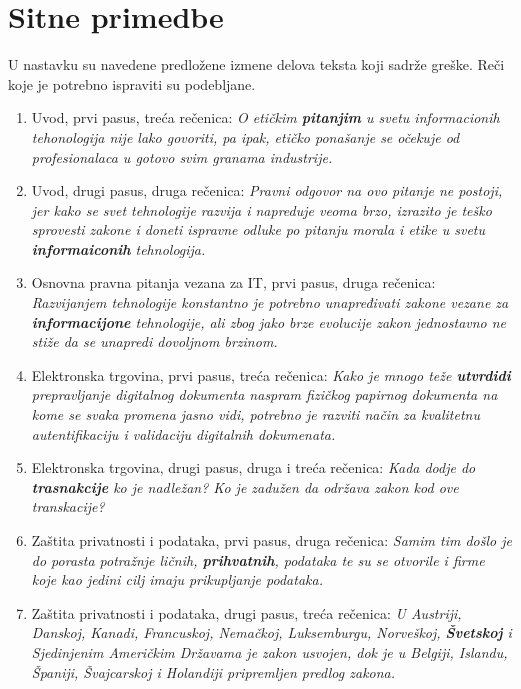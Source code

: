 \documentclass[a4paper]{article}
\begin{document}
\section{Sitne primedbe}
U nastavku su navedene predložene izmene delova teksta koji sadrže greške. Reči koje je potrebno ispraviti su podebljane.
\begin{enumerate}
	\item Uvod, prvi pasus, treća rečenica: \textit{O etičkim \textbf{pitanjim} u svetu informacionih tehonologija nije lako govoriti, pa ipak, etičko ponašanje se očekuje od profesionalaca u gotovo svim granama industrije.}
	\item Uvod, drugi pasus, druga rečenica: \textit{Pravni odgovor na ovo pitanje ne postoji, jer kako se svet tehnologije razvija i napreduje  veoma brzo, izrazito je teško sprovesti zakone i doneti ispravne odluke po pitanju morala i etike u svetu \textbf{informaiconih} tehnologija.}
	\item Osnovna pravna pitanja vezana za IT, prvi pasus, druga rečenica: \textit{Razvijanjem tehnologije konstantno je potrebno unapređivati zakone vezane za \textbf{informacijone} tehnologije, ali zbog jako brze evolucije zakon jednostavno ne stiže da se unapredi dovoljnom brzinom.}
	\item Elektronska trgovina, prvi pasus, treća rečenica: \textit{Kako je mnogo teže \textbf{utvrdidi} prepravljanje digitalnog dokumenta naspram fizičkog papirnog dokumenta na kome se svaka promena jasno vidi, potrebno je razviti način za kvalitetnu autentifikaciju i validaciju digitalnih dokumenata.}
	\item Elektronska trgovina, drugi pasus, druga i treća rečenica: \textit{Kada dodje do \textbf{trasnakcije} ko je nadležan? Ko je zadužen da održava zakon kod ove transkacije?}
	\item Zaštita privatnosti i podataka, prvi pasus, druga rečenica: \textit{Samim tim došlo je do porasta potražnje ličnih, \textbf{prihvatnih}, podataka te su se otvorile i firme koje kao jedini cilj imaju prikupljanje podataka.}
	\item Zaštita privatnosti i podataka, drugi pasus, treća rečenica: \textit{U Austriji, Danskoj, Kanadi, Francuskoj, Nemačkoj, Luksemburgu, Norveškoj, \textbf{Švetskoj} i Sjedinjenim Američkim Državama je zakon usvojen, dok je u Belgiji, Islandu, Španiji, Švajcarskoj i Holandiji pripremljen predlog zakona.}
\end{enumerate}
\end{document}
